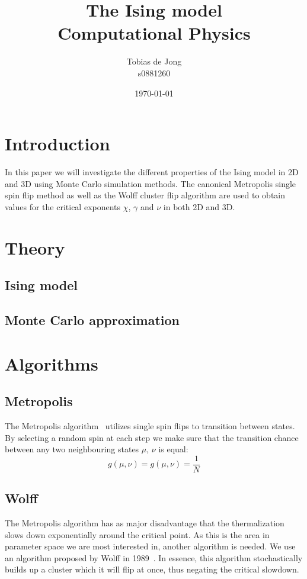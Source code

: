 \documentclass[11pt,twocolumn]{article}
\begin{document}
\title{The Ising model\\ Computational Physics}
\author{Tobias de Jong\\ s0881260}
\date{\today} %

\maketitle
\newcommand{\Part}[3][ ]{\ensuremath{\frac{\partial^{#1} #2}{{\partial #3}^{#1}}}}
\newcommand{\Dif}[3][ ]{\ensuremath{\frac{d^{#1} #2}{{d #3}^{#1}}}}
\renewcommand{\O}[1]{\ensuremath{\mathcal{O}\left(#1\right)}}
\renewcommand{\vec}{\bold}
\section{Introduction}
In this paper we will investigate the different properties of the Ising model in 2D and 3D using Monte Carlo simulation methods. The canonical Metropolis single spin flip method as well as the Wolff cluster flip algorithm are used to obtain values for the critical exponents $\chi$, $\gamma$ and $\nu$ in both 2D and 3D. %
\section{Theory}
\subsection{Ising model}
\subsection{Monte Carlo approximation}
\section{Algorithms}
\subsection{Metropolis}
The Metropolis algorithm~\cite{Metropolis} utilizes single spin flips to transition between states. By selecting a random spin at each step we make sure that the transition chance  between any two neighbouring states $\mu$, $\nu$ is equal:
\[g(\mu,\nu) = g(\mu,\nu) = \frac1N\]
\subsection{Wolff}
The Metropolis algorithm has as major disadvantage that the thermalization slows down exponentially around the critical point. As this is the area in parameter space we are most interested in, another algorithm is needed. We use an algorithm proposed by Wolff in 1989~\cite{Wolff}. In essence, this algorithm stochastically builds up a cluster which it will flip at once, thus negating the critical slowdown.
\end{document}
